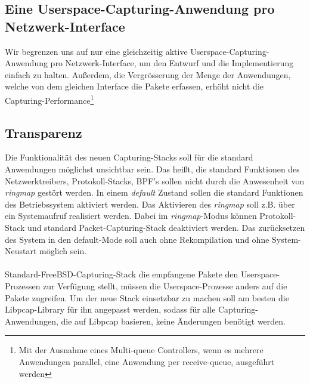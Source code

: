 \subsection{Eine Userspace-Capturing-Anwendung pro Netzwerk-Interface}
Wir begrenzen uns auf nur eine gleichzeitig aktive
Userspace-Capturing-Anwendung pro Netzwerk-Interface, um den Entwurf und die
Implementierung einfach zu halten. Außerdem, die Vergrösserung der Menge der
Anwendungen, welche von dem gleichen Interface die Pakete erfassen, erhöht
nicht die Capturing-Performance\footnote{Mit der Ausnahme eines Multi-queue
Controllers, wenn es mehrere Anwendungen parallel, eine Anwendung per
receive-queue, ausgeführt werden}

\subsection{Transparenz}
Die Funktionalität des neuen Capturing-Stacks soll für die standard Anwendungen
möglichst unsichtbar sein. Das heißt, die standard Funktionen des
Netzwerktreibers, Protokoll-Stacks, BPF's sollen nicht durch die Anwesenheit
von \emph{ringmap} gestört werden. In einem \emph{default} Zustand sollen die
standard Funktionen des Betriebssystem aktiviert werden.  Das Aktivieren des
\emph{ringmap} soll z.B. über ein Systemaufruf realisiert werden. Dabei im
\emph{ringmap}-Modus können Protokoll-Stack und standard Packet-Capturing-Stack
deaktiviert werden. Das zurücksetzen des System in den default-Mode soll auch
ohne Rekompilation und ohne System-Neustart möglich sein.\\\\
%
Standard-FreeBSD-Capturing-Stack die empfangene Pakete den Userspace-Prozessen
zur Verfügung stellt, müssen die Userspace-Prozesse anders auf die Pakete
zugreifen. Um der neue Stack einsetzbar zu machen soll am besten die
Libpcap-Library für ihn angepasst werden, sodass für alle
Capturing-Anwendungen, die auf Libpcap basieren, keine Änderungen benötigt
werden. 

